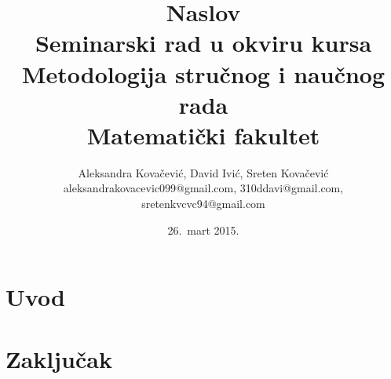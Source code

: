\documentclass[a4paper]{article}
\begin{document}
\title{Naslov\\ \small{Seminarski rad u okviru kursa\\Metodologija stručnog i naučnog rada\\ Matematički fakultet}}

\author{Aleksandra Kovačević, David Ivić, Sreten Kovačević\\ aleksandrakovacevic099@gmail.com, 310ddavi@gmail.com,\\ sretenkvcvc94@gmail.com}
\date{26.~mart 2015.}
\maketitle

\abstract{
}

\tableofcontents

\newpage

\section{Uvod}

\section{Zaključak}

\appendix


\end{document}
